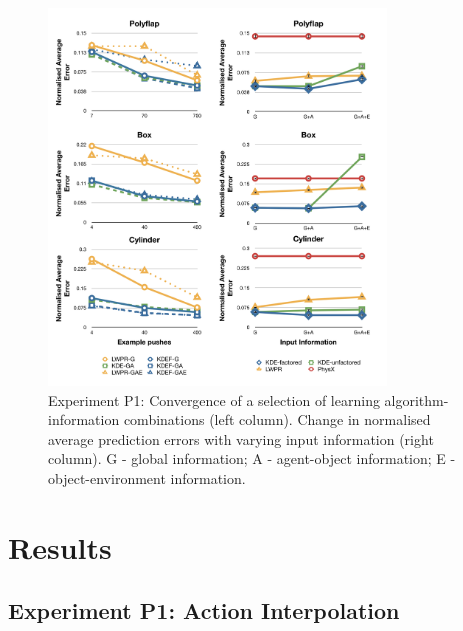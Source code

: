 \begin{figure}[t]
\centerline{
\includegraphics[width=0.8\textwidth]{graphs_jw/P1-graphs}
}
\vspace{-1mm}
\caption{Experiment P1: Convergence of a selection of learning
  algorithm-information combinations (left column). Change in normalised average prediction errors with varying input information (right column). G - global information; A - agent-object information; E - object-environment information.}
\label{fig:Lgraphs}
\end{figure}


\section{Results}\label{sec:Results}

\subsection{Experiment P1: Action Interpolation}\label{sec:Results.Learning}

